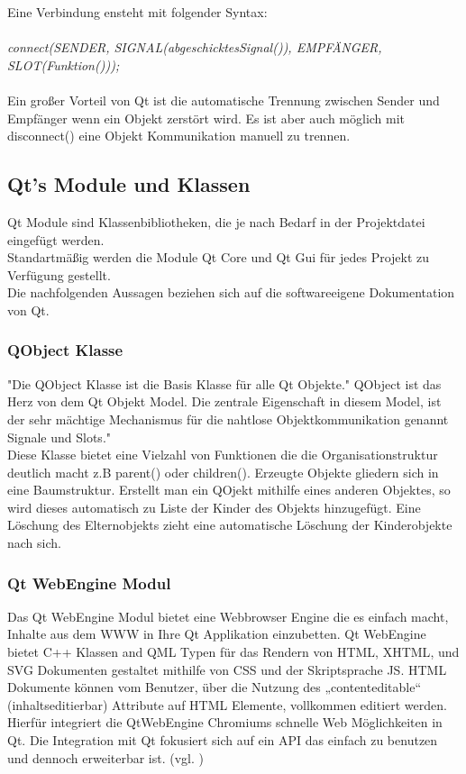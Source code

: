  Eine Verbindung ensteht mit folgender Syntax: \\ \\
\textit{connect(SENDER, SIGNAL(abgeschicktesSignal()), EMPFÄNGER, SLOT(Funktion()));} \\ \\
Ein großer Vorteil von Qt ist die automatische Trennung zwischen Sender und Empfänger wenn ein Objekt zerstört wird. Es ist aber auch möglich mit disconnect() eine Objekt Kommunikation manuell zu trennen.
	
\subsection{Qt's Module und Klassen}
Qt Module sind Klassenbibliotheken, die je nach Bedarf in der Projektdatei eingefügt werden.\\
Standartmäßig werden die Module Qt Core und Qt Gui für jedes Projekt zu Verfügung gestellt. \\
Die nachfolgenden Aussagen beziehen sich auf die softwareeigene Dokumentation von Qt.
	
\subsubsection{QObject Klasse}
"Die QObject Klasse ist die Basis Klasse für alle Qt Objekte."
QObject ist das Herz von dem Qt Objekt Model. Die zentrale Eigenschaft in diesem Model, ist der sehr mächtige Mechanismus für die nahtlose Objektkommunikation genannt Signale und Slots." \cite{QtOB} \\
Diese Klasse bietet eine Vielzahl von Funktionen die die Organisationstruktur deutlich macht z.B parent() oder children(). Erzeugte Objekte gliedern sich in eine Baumstruktur. Erstellt man ein QOjekt mithilfe eines anderen Objektes, so wird dieses automatisch zu Liste der Kinder des Objekts hinzugefügt. Eine Löschung des Elternobjekts zieht eine automatische Löschung der Kinderobjekte nach sich. 
	
\subsubsection{Qt WebEngine Modul}
Das Qt WebEngine Modul bietet eine Webbrowser Engine die es einfach macht, Inhalte aus dem \ac{WWW} in Ihre Qt Applikation einzubetten. Qt WebEngine bietet C++ Klassen and \ac{QML} Typen für das Rendern von \ac{HTML}, \ac{XHTML}, und \ac{SVG} Dokumenten gestaltet mithilfe von \ac{CSS} und der Skriptsprache \ac{JS}. HTML Dokumente können vom Benutzer, über die Nutzung des „contenteditable“ (inhaltseditierbar) Attribute auf HTML Elemente, vollkommen editiert werden. Hierfür integriert die QtWebEngine Chromiums schnelle Web Möglichkeiten in Qt.
Die Integration mit Qt fokusiert sich auf ein \ac{API} das einfach zu benutzen und dennoch erweiterbar ist. (vgl. \cite{QtWB})
	
